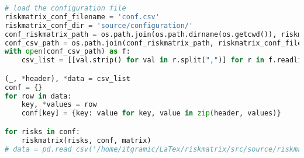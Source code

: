 \begin{lstlisting}[language=python, caption=Python LaTex - riskmatrix - Risxikomatrizen,captionpos=b,label={lst:riskmatrix},breaklines=true]
# load the configuration file
riskmatrix_conf_filename = 'conf.csv'
riskmatrix_conf_dir = 'source/configuration/'
conf_riskmatrix_path = os.path.join(os.path.dirname(os.getcwd()), riskmatrix_conf_dir)
conf_csv_path = os.path.join(conf_riskmatrix_path, riskmatrix_conf_filename)
with open(conf_csv_path) as f:
    csv_list = [[val.strip() for val in r.split(",")] for r in f.readlines()]

(_, *header), *data = csv_list
conf = {}
for row in data:
    key, *values = row
    conf[key] = {key: value for key, value in zip(header, values)}

for risks in conf:
    riskmatrix(risks, conf, matrix)
# data = pd.read_csv('/home/itgramic/LaTex/riskmatrix/src/source/riskmatrixproblem.csv', header=None, dtype={0: str}).set_index(0).squeeze().to_dict()
\end{lstlisting}